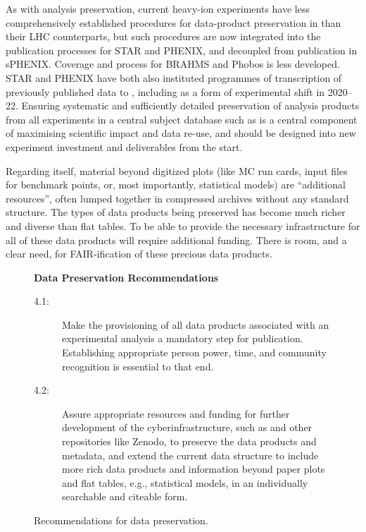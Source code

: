 \documentclass[11pt]{article}
\begin{document}
As with \gls{analysis preservation}, current heavy-ion experiments have less comprehensively established procedures for data-product preservation in \hepdata than their \gls{LHC} counterparts, but such procedures are now integrated into the publication processes for \gls{STAR} and \gls{PHENIX}, and decoupled from publication in \gls{sPHENIX}. Coverage and process for BRAHMS and Phobos is less developed. \gls{STAR} and \gls{PHENIX} have both also instituted programmes of transcription of previously published data to \hepdata, including as a form of experimental shift in 2020--22. Ensuring systematic and sufficiently detailed preservation of analysis products from all experiments in a central subject database such as \hepdata is a central component of maximising scientific impact and data re-use, and should be designed into new experiment investment and deliverables from the start. 

Regarding \hepdata itself, material beyond digitized plots (like MC run cards, input files for benchmark points, or, most importantly, statistical models) are ``additional resources'', often lumped together in compressed archives without any standard structure.
The types of data products being preserved has become much richer and diverse than flat tables.
To be able to provide the necessary infrastructure for all of these data products will require additional funding.
There is room, and a clear need, for \gls{FAIR}-ification of these precious data products. 

\begin{figure}[!ht]
\begin{tcolorbox}
\begin{center}
{\large \textbf{Data Preservation Recommendations}}
\end{center}
%
\begin{description}
   \item[4.1:] Make the provisioning of all \glspl{data product} associated with an experimental analysis a mandatory step for publication.
   Establishing appropriate person power, time, and community recognition is essential to that end.
   \item[4.2:] Assure appropriate resources and funding for further development of the cyberinfrastructure, such as \hepdata and other repositories like Zenodo, to preserve the data products and metadata, and extend the current data structure to include more rich data products and information beyond paper plots and flat tables, e.g., statistical models, in an individually searchable and citeable form.
\end{description}
\end{tcolorbox}
\caption{Recommendations for data preservation.}
\label{fig:recs_datapreservation}
\end{figure}
\end{document}
